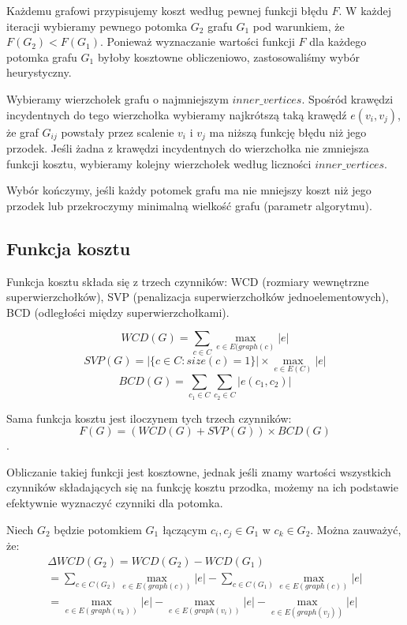 \documentclass[a4paper,10pt]{article}
\begin{document}
Każdemu grafowi przypisujemy koszt według pewnej funkcji błędu $F$.
W każdej iteracji wybieramy pewnego potomka $G_2$ grafu $G_1$ pod warunkiem, że $F(G_2) < F(G_1)$.
Ponieważ wyznaczanie wartości funkcji $F$ dla każdego potomka grafu $G_1$ byłoby kosztowne obliczeniowo, zastosowaliśmy wybór heurystyczny.

Wybieramy wierzchołek grafu o najmniejszym $inner\_vertices$.
Spośród krawędzi incydentnych do tego wierzchołka wybieramy najkrótszą taką krawędź $e(v_i, v_j)$, 
że graf $G_{ij}$ powstały przez scalenie $v_i$ i $v_j$ ma niższą funkcję błędu niż jego przodek.
Jeśli żadna z krawędzi incydentnych do wierzchołka nie zmniejsza funkcji kosztu, wybieramy kolejny wierzchołek według liczności $inner\_vertices$.

Wybór kończymy, jeśli każdy potomek grafu ma nie mniejszy koszt niż jego przodek lub przekroczymy minimalną wielkość grafu (parametr algorytmu).

\subsection{Funkcja kosztu}
Funkcja kosztu składa się z trzech czynników: WCD (rozmiary wewnętrzne superwierzchołków), 
SVP (penalizacja superwierzchołków jednoelementowych), BCD (odległości między superwierzchołkami).

\begin{equation}
 WCD(G) = \sum_{c \in C} \max_{e \in E(graph(c)} |e|
\end{equation}
\begin{equation}
 SVP(G) = |\{c \in C : size(c) = 1\}| \times \max_{e \in E(C)} |e|
\end{equation}
\begin{equation}
 BCD(G) = \sum_{c_1 \in C} \sum_{c_2 \in C} |e(c_1, c_2)|
\end{equation}

Sama funkcja kosztu jest iloczynem tych trzech czynników: 
\begin{equation}
F(G) = (WCD(G) + SVP(G)) \times BCD(G)
\end{equation}.


Obliczanie takiej funkcji jest kosztowne, jednak jeśli znamy wartości wszystkich czynników składających się na funkcję kosztu przodka, 
możemy na ich podstawie efektywnie wyznaczyć czynniki dla potomka.

Niech $G_2$ będzie potomkiem $G_1$ łączącym $c_i, c_j \in G_1$ w $c_k \in G_2$. Można zauważyć, że:
\begin{equation}
\begin{split}
 \Delta WCD(G_2) = WCD(G_2) - WCD(G_1)\\
 = \sum_{c \in C(G_2)} \max_{e \in E(graph(c))} |e| - \sum_{c \in C(G_1)} \max_{e \in E(graph(c))} |e|\\
 = \max_{e \in E(graph(v_k))} |e| - \max_{e \in E(graph(v_i))} |e| - \max_{e \in E(graph(v_j))} |e|
 \end{split}
\end{equation}
\end{document}
